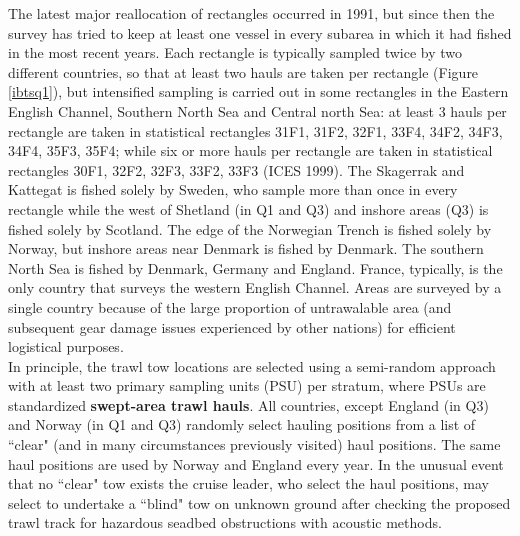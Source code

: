 \documentclass[a4paper 12pt]{article}
\numberwithin{equation}{section}
\begin{document}
\indent The latest major reallocation of rectangles occurred in 1991, but since then the survey has tried to keep at least one vessel in every subarea in which it had fished in the most recent years. Each rectangle is typically sampled twice by two different countries, so that at least two hauls are taken per rectangle (Figure \ref{ibtsq1}), but intensified sampling is carried out in some rectangles in the Eastern English Channel, Southern North Sea and Central north Sea: at least 3 hauls per rectangle are taken in statistical rectangles  31F1, 31F2, 32F1, 33F4, 34F2, 34F3, 34F4, 35F3, 35F4; while six or more hauls per rectangle are taken in statistical rectangles  30F1, 32F2, 32F3, 33F2, 33F3 (ICES 1999).  The Skagerrak and Kattegat is fished solely by Sweden, who sample more than once in every rectangle while the west of Shetland (in Q1 and Q3) and inshore areas (Q3) is fished solely by Scotland. The edge of the Norwegian Trench is fished solely by Norway, but inshore areas near Denmark is fished by Denmark. The southern North Sea is fished by Denmark, Germany and England. France, typically, is the only country that surveys the western English Channel. Areas are surveyed by a single country because of the large proportion of untrawalable area (and subsequent gear damage issues experienced by other nations)  for efficient logistical purposes.\\
\indent In principle, the trawl tow locations are selected using a  semi-random approach with at least two primary sampling units (PSU) per stratum, where PSUs are standardized {\bf swept-area trawl hauls}. All countries, except England (in Q3) and Norway (in Q1 and Q3) randomly select hauling positions from a list of ``clear" (and in many circumstances previously visited) haul positions. The same haul positions are used by Norway and England every year. In the unusual event that no ``clear" tow exists the cruise leader, who select the haul positions, may select to undertake a ``blind" tow on unknown ground after checking the proposed trawl track for hazardous seadbed obstructions with acoustic methods. \\

\end{document}
